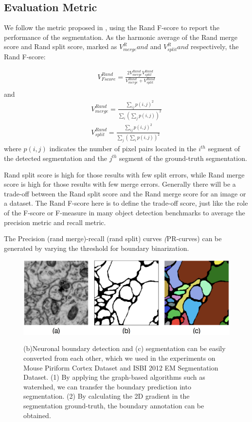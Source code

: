 \documentclass[senior]{IPSstyle}
\begin{document}
\subsection{Evaluation Metric}

We follow the metric proposed in \cite{Lee2015}, using the Rand F-score to report the performance of the segmentation. As the harmonic average of the Rand merge score and Rand split score, marked as \(V_{merge}^Rand\) and \(V_{split}^Rand\) respectively, the Rand F-score:

\begin{eqnarray}
V_{Fscore}^{Rand} = \frac{2 V_{merge}^{Rand} V_{split}^{Rand}}{V_{merge}^{Rand} + V_{split}^{Rand}}\\
\end{eqnarray}
and 
\begin{eqnarray}
V_{merge}^{Rand} = \frac{\sum_{ij} p(i, j)^2}{\sum_i(\sum_j p(i, j))^2} \\
V_{split}^{Rand} = \frac{\sum_{ij} p(i, j)^2}{\sum_j(\sum_i p(i, j))^2}
\end{eqnarray}
where \(p(i, j)\) indicates the number of pixel pairs located in the \(i^{th}\) segment of the detected segmentation and the \(j^{th}\) segment of the ground-truth segmentation.

Rand split score is high for those results with few split errors, while Rand merge score is high for those results with few merge errors. Generally there will be a trade-off between the Rand split score and the Rand merge score for an image or a dataset. The Rand F-score here is to define the trade-off score, just like the role of the F-score or F-measure in many object detection benchmarks to average the precision metric and recall metric.

The Precision (rand merge)-recall (rand split) curves \emph(PR-curves) can be generated by varying the threshold for boundary binarization\cite{Shen2016CVPR}.

\begin{figure}[t]
  \centering
  \includegraphics[width=15cm]{segmentation_and_boundary.png}\\
  \caption{(b)Neuronal boundary detection and (c) segmentation can be easily converted from each other, which we used in the experiments on Mouse Piriform Cortex Dataset\cite{Lee2015} and ISBI 2012 EM Segmentation Dataset\cite{Ronneberger2015}. (1) By applying the graph-based algorithms such as watershed, we can transfer the boundary prediction into segmentation. (2) By calculating the 2D gradient in the segmentation ground-truth, the boundary annotation can be obtained. }\label{segmentation and boundary}
\end{figure}
\end{document}
